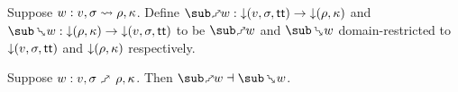 \begin{definition}
   Suppose $w: v, \sigma \rightsquigarrow \rho, \kappa$. Define $\matchFwdF{w}: \Below{(v,\sigma,\TT)} \to \Below{(\rho,\kappa)}$ and $\matchBwdF{w}: \Below{(\rho,\kappa)} \to \Below{(v,\sigma,\TT)}$ to be $\matchFwdR{w}$ and $\matchBwdR{w}$ domain-restricted to ${\downarrow}{(v,\sigma,\mathsf{tt})}$ and ${\downarrow}{(\rho,\kappa)}$ respectively.
\end{definition}

\begin{theorem}
\label{thm:core-language:match:gc}
   Suppose $w: v, \sigma \matchFwdS \rho, \kappa$.  Then $\matchFwdF{w} \adjoint \matchBwdF{w}$.
\end{theorem}
